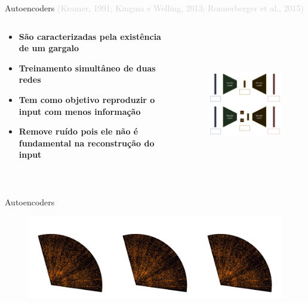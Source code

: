\begin{frame}[c]{Autoencoders {\small \textcolor{LightGray}{(Kramer, 1991; Kingma e Welling, 2013; Ronnerberger et al., 2015)}}}
    \begin{columns}[c]
        \begin{column}{0.36\linewidth}
            \begin{splusbox}{}
                \begin{itemize}
                    \justifying
                    \item \textbf{São caracterizadas pela existência de um gargalo}
                    \item \textbf{Treinamento simultâneo de duas redes}
                    \item \textbf{Tem como objetivo reproduzir o input com menos informação}
                    \item \textbf{Remove ruído pois ele não é fundamental na reconstrução do input}
                \end{itemize}
            \end{splusbox}
        \end{column}
        \begin{column}{0.56\linewidth}
            \begin{figure}
                \centering
                \includegraphics[height=6.5cm]{script/images/autoencoders.png}
            \end{figure}
        \end{column}
    \end{columns}
\end{frame}

\begin{frame}[c]{Autoencoders}
    \begin{figure}
        \centering
        \includegraphics[width=\linewidth]{script/images/redshift_polar_plot_zml_zmlae_zmlvae.pdf}
    \end{figure}
\end{frame}

